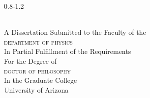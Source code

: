 \begin{titlingpage*}
\thispagestyle{empty}
\calccentering\unitlength
\begin{adjustwidth}{0.8\unitlength}{-1.2\unitlength}
\centering
  \maketitle
  \\\bigskip
  A Dissertation Submitted to the Faculty of the\\
  {\scshape \MakeTextLowercase{Department of Physics}}\\
  In Partial Fulfillment of the Requirements\\
  For the Degree of\\
  {\scshape \MakeTextLowercase{Doctor of Philosophy}}\\
  In the Graduate College\\
  University of Arizona\\
  \bigskip
\end{adjustwidth}
\end{titlingpage*}
